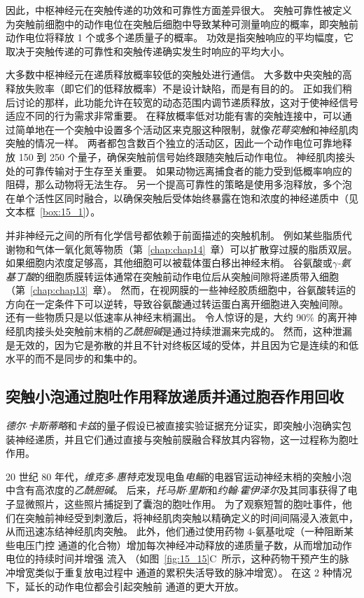 因此，中枢神经元在突触传递的功效和可靠性方面差异很大。
突触可靠性被定义为突触前细胞中的动作电位在突触后细胞中导致某种可测量响应的概率，即突触前动作电位将释放 1 个或多个递质量子的概率。
功效是指突触响应的平均幅度，它取决于突触传递的可靠性和突触传递确实发生时响应的平均大小。


大多数中枢神经元在递质释放概率较低的突触处进行通信。
大多数中央突触的高释放失败率（即它们的低释放概率）不是设计缺陷，而是有目的的。
正如我们稍后讨论的那样，此功能允许在较宽的动态范围内调节递质释放，这对于使神经信号适应不同的行为需求非常重要。
在释放概率低对功能有害的突触连接中，可以通过简单地在一个突触中设置多个活动区来克服这种限制，就像\textit{花萼突触}和神经肌肉突触的情况一样。
两者都包含数百个独立的活动区，因此一个动作电位可靠地释放 150 到 250 个量子，确保突触前信号始终跟随突触后动作电位。
神经肌肉接头处的可靠传输对于生存至关重要。
如果动物远离捕食者的能力受到低概率响应的阻碍，那么动物将无法生存。
另一个提高可靠性的策略是使用多泡释放，多个泡在单个活性区同时融合，以确保突触后受体始终暴露在饱和浓度的神经递质中（见文本框~\ref{box:15_1}）。


并非神经元之间的所有化学信号都依赖于前面描述的突触机制。
例如某些脂质代谢物和气体一氧化氮等物质（第~\ref{chap:chap14}~章）可以扩散穿过膜的脂质双层。
如果细胞内浓度足够高，其他细胞可以被载体蛋白移出神经末梢。
谷氨酸或\textit{$\gamma$-氨基丁酸}的细胞质膜转运体通常在突触前动作电位后从突触间隙将递质带入细胞（第~\ref{chap:chap13}~章）。
然而，在视网膜的一些神经胶质细胞中，谷氨酸转运的方向在一定条件下可以逆转，导致谷氨酸通过转运蛋白离开细胞进入突触间隙。
还有一些物质只是以低速率从神经末梢漏出。
令人惊讶的是，大约 90\% 的离开神经肌肉接头处突触前末梢的\textit{乙酰胆碱}是通过持续泄漏来完成的。
然而，这种泄漏是无效的，因为它是弥散的并且不针对终板区域的受体，并且因为它是连续的和低水平的而不是同步的和集中的。



\subsection{突触小泡通过胞吐作用释放递质并通过胞吞作用回收}

\textit{德尔$\cdot$卡斯蒂略}和\textit{卡兹}的量子假设已被直接实验证据充分证实，即突触小泡确实包装神经递质，并且它们通过直接与突触前膜融合释放其内容物，这一过程称为胞吐作用。


20 世纪 80 年代，\textit{维克多$\cdot$惠特克}发现电鱼\textit{电鳐}的电器官运动神经末梢的突触小泡中含有高浓度的\textit{乙酰胆碱}\cite{whittaker1993thirty}。
后来，\textit{托马斯$\cdot$里斯}和\textit{约翰$\cdot$霍伊泽尔}及其同事获得了电子显微照片，这些照片捕捉到了囊泡的胞吐作用。
为了观察短暂的胞吐事件，他们在突触前神经受到刺激后，将神经肌肉突触以精确定义的时间间隔浸入液氦中，从而迅速冻结神经肌肉突触。
此外，他们通过使用药物 4-氨基吡啶（一种阻断某些电压门控  通道的化合物）增加每次神经冲动释放的递质量子数，从而增加动作电位的持续时间并增强  流入
（如图~\ref{fig:15_15}C~所示，这种药物干预产生的脉冲增宽类似于重复放电过程中  通道的累积失活导致的脉冲增宽）。
在这 2 种情况下，延长的动作电位都会引起突触前  通道的更大开放。


